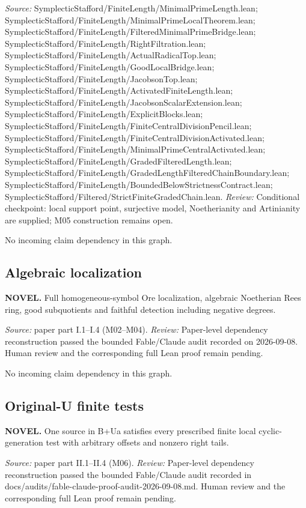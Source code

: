 \emph{Source:} SymplecticStafford/FiniteLength/MinimalPrimeLength.lean; SymplecticStafford/FiniteLength/MinimalPrimeLocalTheorem.lean; SymplecticStafford/FiniteLength/FilteredMinimalPrimeBridge.lean; SymplecticStafford/FiniteLength/RightFiltration.lean; SymplecticStafford/FiniteLength/ActualRadicalTop.lean; SymplecticStafford/FiniteLength/GoodLocalBridge.lean; SymplecticStafford/FiniteLength/JacobsonTop.lean; SymplecticStafford/FiniteLength/ActivatedFiniteLength.lean; SymplecticStafford/FiniteLength/JacobsonScalarExtension.lean; SymplecticStafford/FiniteLength/ExplicitBlocks.lean; SymplecticStafford/FiniteLength/FiniteCentralDivisionPencil.lean; SymplecticStafford/FiniteLength/FiniteCentralDivisionActivated.lean; SymplecticStafford/FiniteLength/MinimalPrimeCentralActivated.lean; SymplecticStafford/FiniteLength/GradedFilteredLength.lean; SymplecticStafford/FiniteLength/GradedLengthFilteredChainBoundary.lean; SymplecticStafford/FiniteLength/BoundedBelowStrictnessContract.lean; SymplecticStafford/Filtered/StrictFiniteGradedChain.lean.
\emph{Review:} Conditional checkpoint: local support point, surjective model, Noetherianity and Artinianity are supplied; M05 construction remains open.

No incoming claim dependency in this graph.
\subsection{Algebraic localization}\hypertarget{claim:local}{}\backmap
\textbf{NOVEL.} Full homogeneous-symbol Ore localization, algebraic Noetherian Rees ring, good subquotients and faithful detection including negative degrees.

\emph{Source:} paper part I.1–I.4 (M02–M04).
\emph{Review:} Paper-level dependency reconstruction passed the bounded Fable/Claude audit recorded on 2026-09-08. Human review and the corresponding full Lean proof remain pending.

No incoming claim dependency in this graph.
\subsection{Original-U finite tests}\hypertarget{claim:tests}{}\backmap
\textbf{NOVEL.} One source in B+Ua satisfies every prescribed finite local cyclic-generation test with arbitrary offsets and nonzero right tails.

\emph{Source:} paper part II.1–II.4 (M06).
\emph{Review:} Paper-level dependency reconstruction passed the bounded Fable/Claude audit recorded in docs/audits/fable-claude-proof-audit-2026-09-08.md. Human review and the corresponding full Lean proof remain pending.


